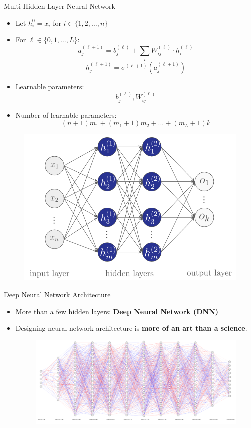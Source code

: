 \documentclass[serif, aspectratio=169]{beamer}
\begin{document}
\begin{frame}{Multi-Hidden Layer Neural Network}
	\begin{itemize}
		\item Let $h^0_i = x_i$ for $i \in \{1, 2, \ldots, n  \}$
		\item For $\ell \in \{0, 1, \ldots, L \}$:
		      $$a^{(\ell+1)}_j = b^{(\ell)}_j + \sum_i W^{(\ell)}_{ij}\cdot h^{(\ell)}_i$$
		      $$h^{(\ell+1)}_j = \sigma^{(\ell+1)}(a^{(\ell+1)}_j)$$
		      
		\item Learnable parameters:
		      $$b^{(\ell)}_j, W^{(\ell)}_{ij}$$
		      
		\item Number of learnable parameters:
		      $$(n+1)m_1 + (m_1 + 1)m_2 + ... + (m_L + 1)k$$
	\end{itemize}
	\endminipage
	\hfill
	\begin{figure}[bh]
		\includegraphics[width=\linewidth]{pic/2/multi-hidden-nn.png}
	\end{figure}
	\endminipage
\end{frame}

\begin{frame}[t]{Deep Neural Network Architecture}
	\begin{itemize}
		\item More than a few hidden layers: \textbf{Deep Neural Network (DNN)}
		\item Designing neural network architecture is \textbf{more of an art than a science}.
		      \begin{figure}[bh]
		      	\includegraphics[keepaspectratio, scale=0.3]{pic/3/huge-nn.png}
		      \end{figure}
	\end{itemize}
\end{frame}
\end{document}
